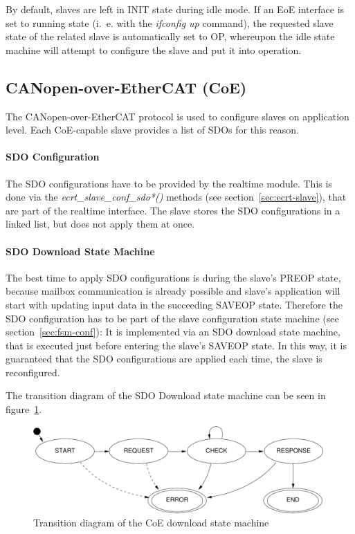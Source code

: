 \documentclass[a4paper,12pt,BCOR6mm,bibtotoc,idxtotoc]{scrbook}
\begin{document}
By default, slaves are left in INIT state during idle mode. If an EoE
interface is set to running state (i.~e. with the \textit{ifconfig up}
command), the requested slave state of the related slave is
automatically set to OP, whereupon the idle state machine will attempt
to configure the slave and put it into operation.


\subsection{CANopen-over-EtherCAT (CoE)}
\label{sec:coeimp}

The CANopen-over-EtherCAT protocol \cite[section~5.6]{alspec} is used
to configure slaves on application level. Each CoE-capable slave
provides a list of SDOs for this reason.

\paragraph{SDO Configuration}

The SDO configurations have to be provided by the realtime module.
This is done via the \textit{ecrt\_slave\_conf\_sdo*()} methods (see
section~\ref{sec:ecrt-slave}), that are part of the realtime
interface. The slave stores the SDO configurations in a linked list,
but does not apply them at once.

\paragraph{SDO Download State Machine}

The best time to apply SDO configurations is during the slave's PREOP
state, because mailbox communication is already possible and slave's
application will start with updating input data in the succeeding
SAVEOP state. Therefore the SDO configuration has to be part of the
slave configuration state machine (see section~\ref{sec:fsm-conf}): It
is implemented via an SDO download state machine, that is executed
just before entering the slave's SAVEOP state. In this way, it is
guaranteed that the SDO configurations are applied each time, the
slave is reconfigured.

The transition diagram of the SDO Download state machine can be seen
in figure~\ref{fig:fsm-coedown}.

\begin{figure}[htbp]
  \centering
  \includegraphics[width=.9\textwidth]{images/fsm-coedown}
  \caption{Transition diagram of the CoE download state machine}
  \label{fig:fsm-coedown}
\end{figure}
\end{document}
